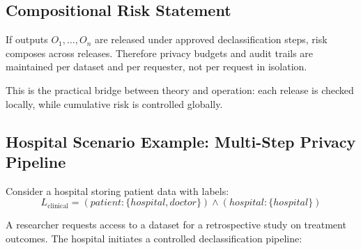 \subsection{Compositional Risk Statement}

If outputs $O_1,\ldots,O_n$ are released under approved declassification steps, risk composes across releases. Therefore privacy budgets and audit trails are maintained per dataset and per requester, not per request in isolation.

This is the practical bridge between theory and operation: each release is checked locally, while cumulative risk is controlled globally.

\subsection{Hospital Scenario Example: Multi-Step Privacy Pipeline}

Consider a hospital storing patient data with labels:
\[
L_{\text{clinical}} = (patient:\{hospital,doctor\}) \wedge (hospital:\{hospital\})
\]

A researcher requests access to a dataset for a retrospective study on treatment outcomes. The hospital initiates a controlled declassification pipeline:

